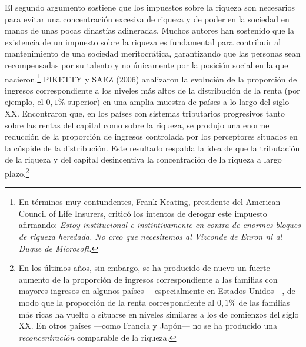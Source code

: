 \documentclass[10pt,a4paper]{article}
\begin{document}
El segundo argumento sostiene que los impuestos sobre la riqueza son necesarios para evitar una concentración excesiva de riqueza y de poder en la sociedad en manos de unas pocas dinastías adineradas. Muchos autores han sostenido que la existencia de un impuesto sobre la riqueza es fundamental para contribuir al mantenimiento de una sociedad meritocrática, garantizando que las personas sean recompensadas por su talento y no únicamente por la posición social en la que nacieron.\footnote{%
    En términos muy contundentes, Frank Keating, presidente del American Council of Life Insurers, criticó los intentos de derogar este impuesto afirmando: \textit{Estoy institucional e instintivamente en contra de enormes bloques de riqueza heredada. No creo que necesitemos al Vizconde de Enron ni al Duque de Microsoft}.
} PIKETTY y SAEZ (2006) analizaron la evolución de la proporción de ingresos correspondiente a los niveles más altos de la distribución de la renta (por ejemplo, el $0,1\%$ superior) en una amplia muestra de países a lo largo del siglo XX. Encontraron que, en los países con sistemas tributarios progresivos tanto sobre las rentas del capital como sobre la riqueza, se produjo una enorme reducción de la proporción de ingresos controlada por los perceptores situados en la cúspide de la distribución. Este resultado respalda la idea de que la tributación de la riqueza y del capital desincentiva la concentración de la riqueza a largo plazo.\footnote{%
    En los últimos años, sin embargo, se ha producido de nuevo un fuerte aumento de la proporción de ingresos correspondiente a las familias con mayores ingresos en algunos países —especialmente en Estados Unidos—, de modo que la proporción de la renta correspondiente al $0,1\%$ de las familias más ricas ha vuelto a situarse en niveles similares a los de comienzos del siglo XX. En otros países —como Francia y Japón— no se ha producido una \textit{reconcentración} comparable de la riqueza.
}
\end{document}
